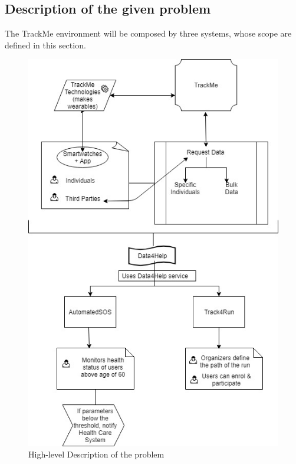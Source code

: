 \documentclass[12pt]{report}
\begin{document}
\subsection{Description of the given problem}
The TrackMe environment will be composed by three systems, whose scope are defined in this section. \\

\begin{figure}[H]
\centering
\includegraphics[scale=0.45]{Diagrams/high_level.jpg}
\caption[High-level Description of the problem]{High-level Description of the problem}
\label{fig:High_level}
\end{figure}
\end{document}
